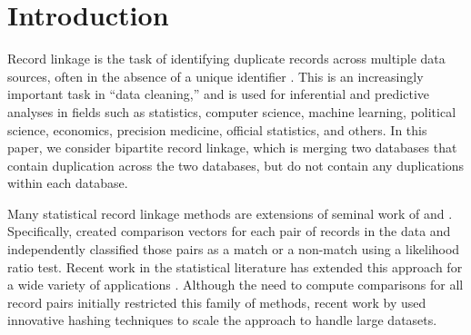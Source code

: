 \documentclass[12pt,letterpaper]{article}
\newcommand{\1}[1]{\mathbb{I}\!\left[#1\right]} %
\begin{document}
\section{Introduction}
\label{sec:introduction}
	
%	
%	
%	
	

	
	Record linkage is the task of identifying duplicate records across multiple data sources, often in the absence of a unique identifier \citep{christen_2012}. This is an increasingly important task in ``data cleaning,'' and is used for inferential and predictive analyses in fields such as statistics, computer science, machine learning, political science, economics, precision medicine, official statistics, and others. In this paper, we consider bipartite record linkage, which is merging two databases that contain duplication across the two databases, but do not contain any duplications within each database. 
	
	
	Many statistical record linkage methods are extensions of seminal work of \cite{fellegi_theory_1969} and \cite{newcombe_automatic_1959}. Specifically, \cite{fellegi_theory_1969} created comparison vectors for each pair of records in the data and independently classified those pairs as a match or a non-match using a likelihood ratio test. Recent work in the statistical literature has extended this approach for a wide variety of applications \citep{winkler1991application, fair2004generalized, wagner2014person, gill2003english}. Although the need to compute comparisons for all record pairs initially restricted this family of methods, recent work by \cite{enamorado2019using} used innovative hashing techniques to scale the approach to handle large datasets.
	
\end{document}
